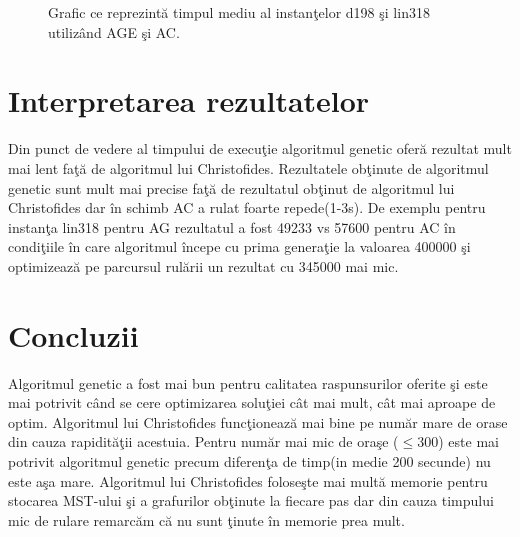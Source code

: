 \documentclass[11pt,leqno]{article}
\begin{document}
	\begin{figure}[H]
\caption{Grafic ce reprezint\u a timpul mediu al instan\c telor d198 \c si lin318 utiliz\^ and AGE \c si AC.}
	\end{figure}




\section{Interpretarea rezultatelor}
Din punct de vedere al timpului de execu\c tie algoritmul genetic ofer\u a rezultat mult mai lent fa\c t\u a de algoritmul lui Christofides. Rezultatele ob\c tinute de algoritmul genetic sunt  mult mai precise fa\c t\u a de rezultatul ob\c tinut de algoritmul lui Christofides dar \^ in schimb AC a rulat foarte repede(1-3s). De exemplu pentru instan\c ta lin318 pentru AG rezultatul a fost 49233 vs 57600 pentru AC \^ in condi\c tiile \^ in care algoritmul \^ incepe cu prima genera\c tie la valoarea 400000 \c si optimizeaz\u a pe parcursul rul\u arii un rezultat cu 345000 mai mic.
	
\section{Concluzii}
Algoritmul genetic a fost mai bun pentru calitatea raspunsurilor oferite \c si este mai potrivit c\^ and se cere optimizarea solu\c tiei c\^ at mai mult, c\^ at mai aproape de optim.
Algoritmul lui Christofides func\c tioneaz\u a mai bine pe num\u ar mare de orase din cauza rapidit\u a\c tii acestuia. Pentru num\u ar mai mic de ora\c se ($\le 300$) este mai potrivit algoritmul genetic
precum diferen\c ta de timp(in medie 200 secunde) nu este a\c sa mare. Algoritmul lui Christofides folose\c ste mai mult\u a memorie pentru stocarea MST-ului \c si a grafurilor ob\c tinute la fiecare pas dar
din cauza timpului mic de rulare remarc\u am c\u a nu sunt \c tinute \^ in memorie prea mult.
\end{document}
